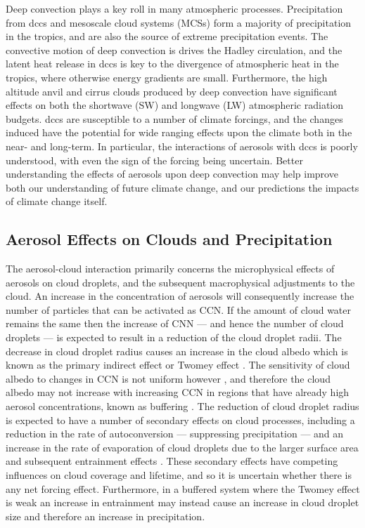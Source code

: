 Deep convection plays a key roll in many atmospheric processes.
Precipitation from \acrshort{dcc}s and mesoscale cloud systems (MCSs) form a majority of precipitation in the tropics, and are also the source of extreme precipitation events.
The convective motion of deep convection is drives the Hadley circulation, and the latent heat release in \acrshort{dcc}s is key to the divergence of atmospheric heat in the tropics, where otherwise energy gradients are small.
Furthermore, the high altitude anvil and cirrus clouds produced by deep convection have significant effects on both the shortwave (SW) and longwave (LW) atmospheric radiation budgets.
\acrshort{dcc}s are susceptible to a number of climate forcings, and the changes induced have the potential for wide ranging effects upon the climate both in the near- and long-term.
In particular, the interactions of aerosols with \acrshort{dcc}s is poorly understood, with even the sign of the forcing being uncertain. Better understanding the effects of aerosols upon deep convection may help improve both our understanding of future climate change, and our predictions the impacts of climate change itself.

\subsection{Aerosol Effects on Clouds and Precipitation}

The aerosol-cloud interaction primarily concerns the microphysical effects of aerosols on cloud droplets, and the subsequent macrophysical adjustments to the cloud.
An increase in the concentration of aerosols will consequently increase the number of particles that can be activated as CCN.
If the amount of cloud water remains the same then the increase of CNN --- and hence the number of cloud droplets --- is expected to result in a reduction of the cloud droplet radii.
The decrease in cloud droplet radius causes an increase in the cloud albedo which is known as the primary indirect effect or Twomey effect \citep{twomey_pollution_1974}.
The sensitivity of cloud albedo to changes in CCN is not uniform however \citep{twomey_aerosols_1991}, and therefore the cloud albedo may not increase with increasing CCN in regions that have already high aerosol concentrations, known as buffering \citep{stevens_untangling_2009}.
The reduction of cloud droplet radius is expected to have a number of secondary effects on cloud processes, including a reduction in the rate of autoconversion --- suppressing precipitation \citep{albrecht_aerosols_1989} --- and an increase in the rate of evaporation of cloud droplets due to the larger surface area and subsequent entrainment effects \citep{ackerman_impact_2004}.
These secondary effects have competing influences on cloud coverage and lifetime, and so it is uncertain whether there is any net forcing effect.
Furthermore, in a buffered system where the Twomey effect is weak an increase in entrainment may instead cause an increase in cloud droplet size \citep{jia_is_2019} and therefore an increase in precipitation.

